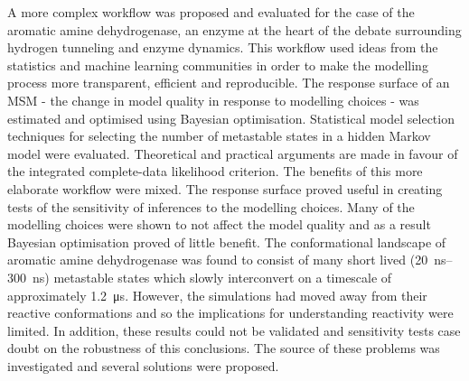 \begin{SingleSpace}
A more complex workflow was proposed and evaluated for the case of the aromatic amine dehydrogenase, an enzyme at the heart of the debate surrounding hydrogen tunneling and enzyme dynamics.  This workflow used ideas from the statistics and machine learning communities in order to make the modelling  process more transparent, efficient and reproducible.  The response surface of an MSM - the change in model quality in response to modelling choices - was estimated and optimised using Bayesian optimisation. Statistical model selection techniques for selecting the number of metastable states in a hidden Markov model were evaluated. Theoretical and practical arguments are made in favour of the integrated complete-data likelihood criterion. The benefits of this more elaborate workflow were mixed.  The response surface proved useful in creating tests of the sensitivity of inferences to the modelling choices.  Many of the modelling choices were shown to not affect the model quality and as a result Bayesian optimisation proved of little benefit. The conformational landscape of aromatic amine dehydrogenase was found to consist of many short lived  (\SIrange{20}{300}{\nano\second}) metastable states which slowly interconvert on a timescale of approximately \SI{1.2}{\micro\second}. However, the simulations had moved away from their reactive conformations and so the implications for understanding reactivity were limited. In addition, these results could not be validated and sensitivity tests case doubt on the robustness of this conclusions. The source of these problems was investigated and several solutions were proposed.  


 
 

\end{SingleSpace}
\clearpage